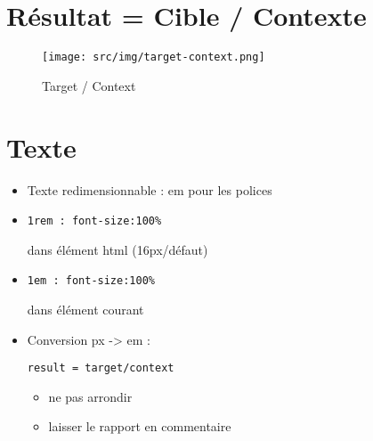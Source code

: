 \begin{otherlanguage}{english}

\begin{Shaded}
\begin{Highlighting}[]
\KeywordTok{>}
\end{Highlighting}
\end{Shaded}

\end{otherlanguage}

\hypertarget{ruxe9sultat-cible-contexte}{%
\section{Résultat = Cible / Contexte}\label{ruxe9sultat-cible-contexte}}

\begin{figure}
\centering
\texttt{[image: src/img/target-context.png]}
\caption{Target / Context}
\end{figure}

\hypertarget{texte}{%
\section{Texte}\label{texte}}

\begin{itemize}
\tightlist
\item
  Texte redimensionnable : em pour les polices
\item
  \begin{otherlanguage}{english}\texttt{1rem\ :\ font-size:100\%}\end{otherlanguage}
  dans élément html (16px/défaut)
\item
  \begin{otherlanguage}{english}\texttt{1em\ :\ font-size:100\%}\end{otherlanguage}
  dans élément courant
\item
  Conversion px -\textgreater{} em :
  \begin{otherlanguage}{english}\texttt{result\ =\ target/context}\end{otherlanguage}

  \begin{itemize}
  \tightlist
  \item
    ne pas arrondir
  \item
    laisser le rapport en commentaire
  \end{itemize}
\end{itemize}

